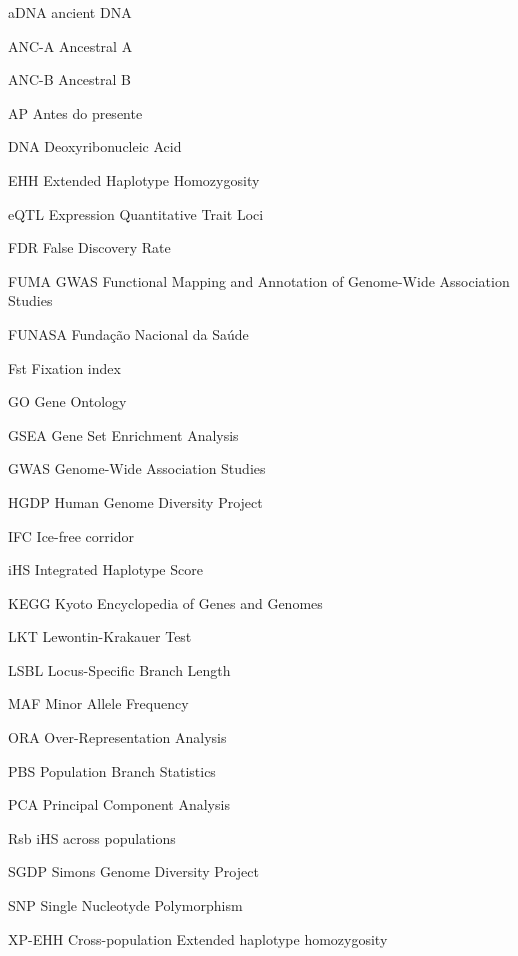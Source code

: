 \documentclass[12pt,openright,twoside,a4paper,sumario=tradicional,english,brazil]{abntex2}
\begin{document}

\listoffigures*
\cleardoublepage


\listoftables*
\cleardoublepage


\begin{siglas}
  \item[aDNA] ancient DNA
  \item[ANC-A] Ancestral A
  \item[ANC-B] Ancestral B
  \item[AP] Antes do presente
  \item[DNA] Deoxyribonucleic Acid 
  \item[EHH] Extended Haplotype Homozygosity
  \item[eQTL] Expression Quantitative Trait Loci
  \item[FDR] False Discovery Rate
  \item[FUMA GWAS] Functional Mapping and Annotation of Genome-Wide Association Studies
  \item[FUNASA] Fundação Nacional da Saúde
  \item[Fst] Fixation index
  \item[GO] Gene Ontology
  \item[GSEA] Gene Set Enrichment Analysis
  \item[GWAS] Genome-Wide Association Studies
  \item[HGDP] Human Genome Diversity Project
  \item[IFC] Ice-free corridor
  \item[iHS] Integrated Haplotype Score
  \item[KEGG] Kyoto Encyclopedia of Genes and Genomes
  \item[LKT] Lewontin-Krakauer Test
  \item[LSBL] Locus-Specific Branch Length
  \item[MAF] Minor Allele Frequency
  \item[ORA] Over-Representation Analysis
  \item[PBS] Population Branch Statistics
  \item[PCA] Principal Component Analysis
  \item[Rsb] iHS across populations
  \item[SGDP] Simons Genome Diversity Project
  \item[SNP] Single Nucleotyde Polymorphism
  \item[XP-EHH] Cross-population Extended haplotype homozygosity
\end{siglas}
\end{document}
